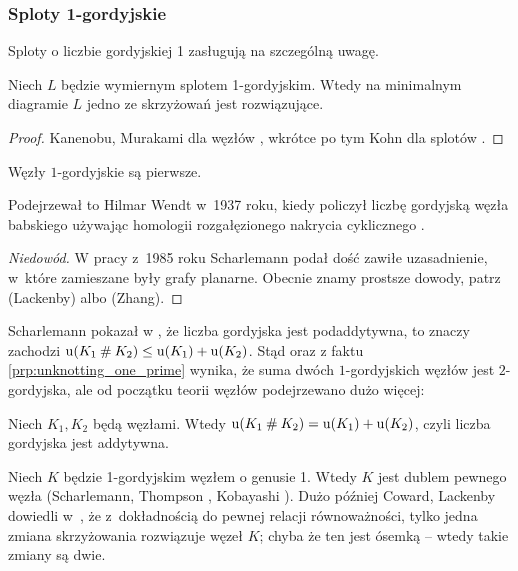 
\subsubsection{Sploty 1-gordyjskie}
Sploty o liczbie gordyjskiej 1 zasługują na szczególną uwagę.

\begin{proposition}
%
    Niech $L$ będzie wymiernym splotem 1-gordyjskim.
    Wtedy na minimalnym diagramie $L$ jedno ze skrzyżowań jest rozwiązujące.
\end{proposition}

\begin{proof}
%
%
%
    Kanenobu, Murakami dla węzłów \cite{kanenobumurakami86}, wkrótce po tym Kohn dla splotów \cite{kohn91}.
\end{proof}

\begin{proposition}
\label{prp:unknotting_one_prime}%
    Węzły $1$-gordyjskie są pierwsze.
\end{proposition}

Podejrzewał to Hilmar Wendt w~1937 roku, kiedy policzył liczbę gordyjską węzła babskiego używając homologii rozgałęzionego nakrycia cyklicznego \cite{wendt37}.
%

\begin{proof}[Niedowód]
%
%
%
    W pracy \cite{scharlemann85} z~1985 roku Scharlemann podał dość zawiłe uzasadnienie, w~które zamieszane były grafy planarne.
    Obecnie znamy prostsze dowody, patrz \cite{lackenby97} (Lackenby) albo \cite{zhang91} (Zhang).
\end{proof}

Scharlemann pokazał w \cite[wniosek 1.6]{scharlemann98}, że liczba gordyjska jest podaddytywna, to znaczy zachodzi $\operatorname{u}(K_1 \mathbin{\#} K_2) \le \operatorname{u}(K_1) + \operatorname{u}(K_2)$.
Stąd oraz z faktu \ref{prp:unknotting_one_prime} wynika, że suma dwóch $1$-gordyjskich węzłów jest $2$-gordyjska, ale od początku teorii węzłów podejrzewano dużo więcej:

\begin{conjecture}
%
    Niech $K_1, K_2$ będą węzłami.
    Wtedy $\operatorname{u} (K_1 \mathbin{\#} K_2) = \operatorname{u}(K_1) + \operatorname{u}(K_2)$, czyli liczba gordyjska jest addytywna.
\end{conjecture}

Niech $K$ będzie 1-gordyjskim węzłem o genusie 1.
Wtedy $K$ jest dublem pewnego węzła (Scharlemann, Thompson \cite{thompson88}, Kobayashi \cite{kobayashitsuyoshi89}).
%
%
%
Dużo później Coward, Lackenby dowiedli w~\cite{coward11}, że z~dokładnością do pewnej relacji równoważności, tylko jedna zmiana skrzyżowania rozwiązuje węzeł $K$; chyba że ten jest ósemką -- wtedy takie zmiany są dwie.
%
%

